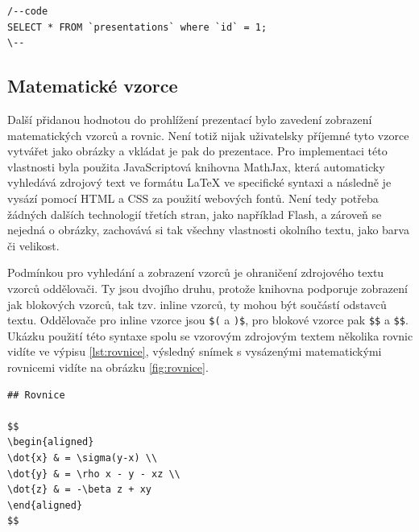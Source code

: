\documentclass[11pt,twoside,a4paper]{book}
\begin{document}
\begin{lstlisting}[caption={Ukázka blokové syntaxe pro výpis kódu},label={lst:code}]
/--code
SELECT * FROM `presentations` where `id` = 1;
\--
\end{lstlisting}


\subsection{Matematické vzorce}
Další přidanou hodnotou do prohlížení prezentací bylo zavedení zobrazení matematických vzorců a rovnic. Není totiž nijak uživatelsky příjemné tyto vzorce vytvářet jako obrázky a vkládat je pak do prezentace. Pro implementaci této vlastnosti byla použita JavaScriptová knihovna MathJax\citep{mathjax}, která automaticky vyhledává zdrojový text ve formátu \LaTeX\cite{latex} ve specifické syntaxi a následně je vysází pomocí HTML a CSS za použití webových fontů. Není tedy potřeba žádných dalších technologií třetích stran, jako například Flash, a zároveň se nejedná o obrázky, zachovává si tak všechny vlastnosti okolního textu, jako barva či velikost.

Podmínkou pro vyhledání a zobrazení vzorců je ohraničení zdrojového textu vzorců oddělovači. Ty jsou dvojího druhu, protože knihovna podporuje zobrazení jak blokových vzorců, tak tzv. inline vzorců, ty mohou být součástí odstavců textu. Oddělovače pro inline vzorce jsou \verb|$(| a \verb|)$|, pro blokové vzorce pak \verb|$$| a \verb|$$|. Ukázku použití této syntaxe spolu se vzorovým zdrojovým textem několika rovnic vidíte ve výpisu \ref{lst:rovnice}, výsledný snímek s vysázenými matematickými rovnicemi vidíte na obrázku \ref{fig:rovnice}.

\begin{lstlisting}[caption={Ukázka syntaxe matematických vzorců},label={lst:rovnice}]
## Rovnice

$$
\begin{aligned}
\dot{x} & = \sigma(y-x) \\
\dot{y} & = \rho x - y - xz \\
\dot{z} & = -\beta z + xy
\end{aligned}
$$
\end{lstlisting}
\end{document}
